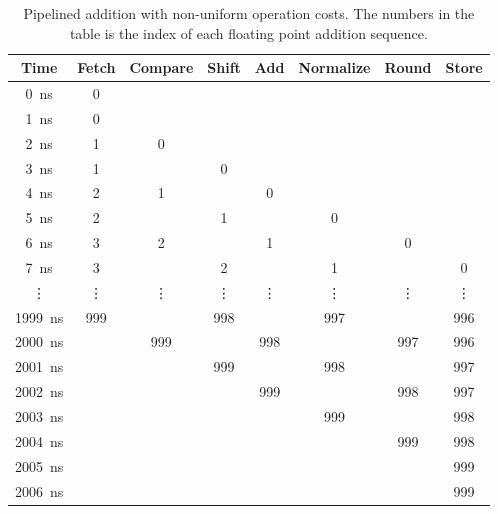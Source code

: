 \begin{enumerate}
\begin{enumerate}
\begin{center}
\begin{table}
\begin{tabular}{cccccccc}
\hline
Time           & Fetch & Compare & Shift & Add & Normalize & Round & Store \\
\hline
\SI{   0}{ns}  & 0      &        &        &        &           &        &        \\
\SI{   1}{ns}  & 0      &        &        &        &           &        &        \\
\SI{   2}{ns}  & 1      & 0      &        &        &           &        &        \\
\SI{   3}{ns}  & 1      &        & 0      &        &           &        &        \\
\SI{   4}{ns}  & 2      & 1      &        & 0      &           &        &        \\
\SI{   5}{ns}  & 2      &        & 1      &        & 0         &        &        \\
\SI{   6}{ns}  & 3      & 2      &        & 1      &           & 0      &        \\
\SI{   7}{ns}  & 3      &        & 2      &        & 1         &        & 0      \\
\vdots         & \vdots & \vdots & \vdots & \vdots & \vdots    & \vdots & \vdots \\
\SI{1999}{ns}  & 999    &        & 998    &        & 997       &        & 996    \\
\SI{2000}{ns}  &        & 999    &        & 998    &           & 997    & 996    \\
\SI{2001}{ns}  &        &        & 999    &        & 998       &        & 997    \\
\SI{2002}{ns}  &        &        &        & 999    &           & 998    & 997    \\
\SI{2003}{ns}  &        &        &        &        & 999       &        & 998    \\
\SI{2004}{ns}  &        &        &        &        &           & 999    & 998    \\
\SI{2005}{ns}  &        &        &        &        &           &        & 999    \\
\SI{2006}{ns}  &        &        &        &        &           &        & 999    \\
\hline
\end{tabular}
\caption{Pipelined addition with non-uniform operation costs. The numbers in the table is the index of each floating point addition sequence.}
\label{table:pipelined_addition}
\end{table}
\end{center}


\end{enumerate}
\end{enumerate}
